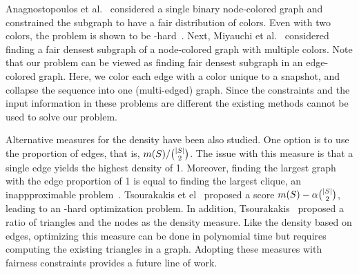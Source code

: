 Anagnostopoulos et al.~\cite{anagnostopoulos2020spectral} considered a single binary node-colored graph and constrained the subgraph to have a fair distribution of colors.
Even with two colors, the problem is shown to be \np-hard~\cite{anagnostopoulos2020spectral}.
Next, Miyauchi et al.~\cite{miyauchi2023densestdiverse} considered finding a fair densest subgraph of a node-colored graph with multiple colors.
Note that our problem can be viewed as finding fair densest subgraph in an edge-colored graph. Here, we color each edge with a color unique to a snapshot, and collapse the sequence into one (multi-edged) graph. Since the constraints and the input information in these problems are different the existing methods cannot be used to solve our problem.

Alternative measures for the density have been also studied. One
 option is to use the proportion of edges, that is, $m(S) / {{\left|S\right|}  \choose 2}$. The issue with this measure is that a single edge yields the highest density of 1. Moreover, finding the largest graph with the edge proportion of 1 is equal to finding the largest clique, an inappproximable problem~\citep{hastad1996clique}.
 Tsourakakis et el~\cite{tsourakakis2013denser} proposed a score $m(S) - \alpha {{\left|S\right|} \choose 2}$, leading to an \np-hard optimization problem. In addition, Tsourakakis~\cite{tsourakakis2015k} proposed a ratio of triangles 
 and the nodes as the density measure. Like the density based on edges, optimizing
 this measure can be done in polynomial time but requires computing the existing triangles in a graph. Adopting these measures with fairness constraints provides a future line of work.








